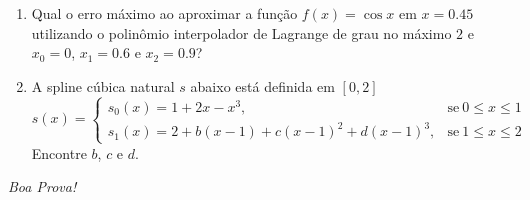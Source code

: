 \documentclass[a4paper,5pt]{amsbook}
\begin{document}
\begin{enumerate}
	\item Qual o erro m\'aximo ao aproximar a fun\c{c}\~ao $f(x) = \cos{x}$ em $x=0.45$
		utilizando o polin\^omio interpolador de Lagrange de grau no m\'aximo $2$ e
		$x_0=0$, $x_1=0.6$ e $x_2=0.9$?
	\vspace{0.5cm}

	\item A spline c\'ubica natural $s$ abaixo est\'a definida em $[0,2]$
		\[s(x) = \left\{\begin{array}{ll}
					s_0(x) = 1+2x-x^3, & \text{se}\ 0 \le x \le 1 \\
					s_1(x) = 2+b(x-1)+c{(x-1)}^2+d{(x-1)}^3, & \text{se}\ 1 \le x \le 2
				\end{array}\right.\]
		Encontre $b$, $c$ e $d$.
\end{enumerate}

\begin{flushright}
	\vspace{1cm}
	\textit{Boa Prova!}
\end{flushright}
\end{document}

